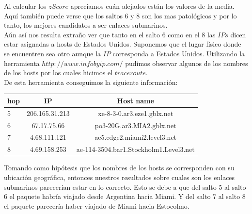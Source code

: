 Al calcular los $zScore$ apreciamos cuán alejados están los valores de la media.
Aquí también puede verse que los saltos 6 y 8 son los mas patológicos y por lo tanto, los mejores candidatos a ser enlaces submarinos.\\

Aún así nos resulta extraño ver que tanto en el salto 6 como en el 8 las $IPs$ dicen estar asignadas a hosts de Estados Unidos. 
Suponemos que el lugar físico donde se encuentren sea otro aunque la $IP$ corresponda a Estados Unidos.
Utilizando la herramienta $http://www.infobyip.com/$ pudimos observar algunos de los nombres de los hosts por los cuales hicimos el $traceroute$.\\

De esta herramienta conseguimos la siguiente información:\\

\bigskip
\begin{tabular}{| l | c | c |}
\hline 
hop & IP & Host name\\
\hline 
5  &  206.165.31.213  &  xe-8-3-0.ar3.eze1.gblx.net\\
\hline 
6  &  67.17.75.66  &   po3-20G.ar3.MIA2.gblx.net\\
\hline 
7  &  4.68.111.121  & ae5.edge2.miami2.level3.net\\
\hline 
8  &  4.69.158.253  & ae-114-3504.bar1.Stockholm1.Level3.net\\
\hline 
\end{tabular}
\bigskip

Tomando como hipótesis que los nombres de los hosts se corresponden con su ubicación geográfica, entonces nuestros resultados sobre 
cuales son los enlaces submarinos parecerían estar en lo correcto. Esto se debe a que del salto 5 al salto 6 el paquete habría viajado desde Argentina 
hacia Miami. Y del salto 7 al salto 8 el paquete parecería haber viajado de Miami hacia Estocolmo.\\

